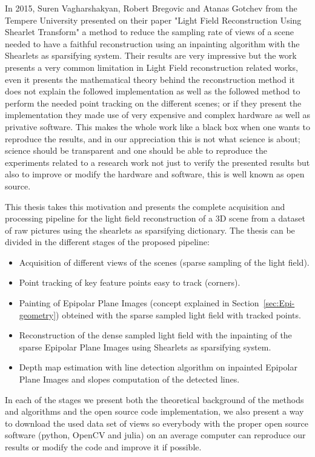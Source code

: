 In 2015, Suren Vagharshakyan, Robert Bregovic and Atanas Gotchev from the Tempere University presented on their paper "Light Field Reconstruction Using Shearlet Transform"\cite{LF-Shearlets} a method to reduce the sampling rate of views of a scene needed to have a faithful reconstruction using an inpainting algorithm with the Shearlets as sparsifying system. Their results are very impressive but the work presents a very common limitation in Light Field reconstruction related works, even it presents the mathematical theory behind the reconstruction method it does not explain the followed implementation as well as the followed method to perform the needed point tracking on the different scenes; or if they present the implementation they made use of very expensive and complex hardware as well as privative software. This makes the whole work like a black box when one wants to reproduce the results, and in our appreciation this is not what science is about; science should be transparent and one should be able to reproduce the experiments related to a research work not just to verify the presented results but also to improve or modify the hardware and software, this is well known as open source. 

\bigskip

This thesis takes this motivation and presents the complete acquisition and processing pipeline for the light field reconstruction of a 3D scene from a dataset of raw pictures using the shearlets as sparsifying dictionary. The thesis can be divided in the different stages of the proposed pipeline:

\begin{itemize}
\item Acquisition of different views of the scenes (sparse sampling of the light field).
\item Point tracking of key feature points easy to track (corners).
\item Painting of Epipolar Plane Images (concept explained in Section~\ref{sec:Epi-geometry}) obteined with the sparse sampled light field with tracked points.
\item Reconstruction of the dense sampled light field with the inpainting of the sparse Epipolar Plane Images using Shearlets as sparsifying system. 
\item Depth map estimation with line detection algorithm on inpainted Epipolar Plane Images and slopes computation of the detected lines.
\end{itemize}

In each of the stages we present both the theoretical background of the methods and algorithms and the open source code implementation, we also present a way to download the used data set of views so everybody with the proper open source software (python, OpenCV and julia) on an average computer can reproduce our results or modify the code and improve it if possible.

